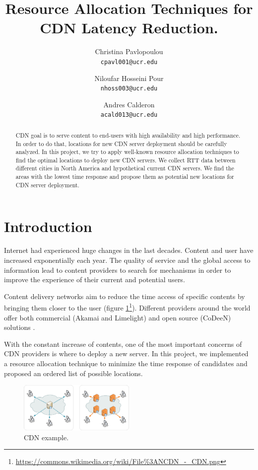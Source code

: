 \documentclass[11pt,twocolumn]{article}
\title{Resource Allocation Techniques for CDN Latency Reduction.}
\author{
   Christina Pavlopoulou\\
  \small \texttt{cpavl001@ucr.edu}
  \and
   Niloufar Hosseini Pour\\
  \small \texttt{nhoss003@ucr.edu}
  \and
   Andres Calderon\\
  \small \texttt{acald013@ucr.edu}
}
\begin{document}
\maketitle

\begin{abstract}
CDN goal is to serve content to end-users with high availability and high performance.  In order to do that, locations for new CDN server deployment should be carefully analyzed.  In this project, we try to apply well-known resource allocation techniques to find the optimal locations to deploy new CDN servers.  We collect RTT data between different cities in North America and hypothetical current CDN servers.  We find the areas with the lowest time response and propose them as potential new locations for CDN server deployment. 
\end{abstract}

\section{Introduction}
Internet had experienced huge changes in the last decades.  Content and user have increased exponentially each year.  The quality of service and the global access to information lead to content providers to search for mechanisms in order to improve the experience of their current and potential users.   

Content delivery networks aim to reduce the time access of specific contents by bringing them closer to the user (figure \ref{fig:cdn}\footnote{\url{https://commons.wikimedia.org/wiki/File\%3ANCDN_-_CDN.png}}).  Different providers around the world offer both commercial (Akamai and Limelight) and open source (CoDeeN) solutions \cite{Huang:2008:MEL:1452520.1455517}.

With the constant increase of contents, one of the most important concerns of CDN providers is where to deploy a new server.  In this project, we implemented a resource allocation technique to minimize the time response of candidates and proposed an ordered list of possible locations. 

\begin{figure}
  \centering
  \includegraphics[width=0.5\textwidth]{CDN.png}
  \caption{CDN example.}\label{fig:cdn}
\end{figure}
\end{document}
